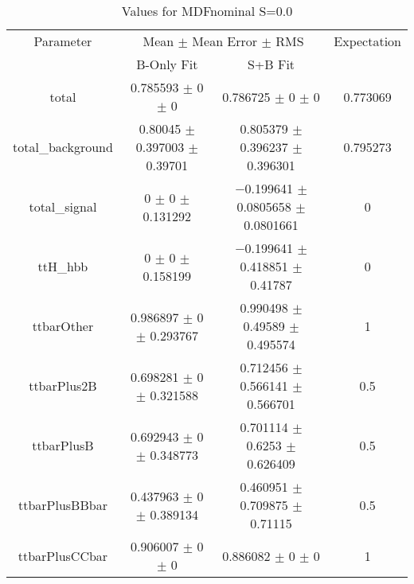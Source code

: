 \begin{table}
\centering
\caption{Values for MDFnominal S=0.0}
\begin{tabular}{cccc}
\toprule
Parameter & \multicolumn{2}{c}{Mean $\pm$ Mean Error $\pm$ RMS} & Expectation\\
 & B-Only Fit & S+B Fit & \\
\midrule
total & \num{0.785593} $\pm$ \num{0} $\pm$ \num{0} & \num{0.786725} $\pm$ \num{0} $\pm$ \num{0} & \num{0.773069}\\
total\_background & \num{0.80045} $\pm$ \num{0.397003} $\pm$ \num{0.39701} & \num{0.805379} $\pm$ \num{0.396237} $\pm$ \num{0.396301} & \num{0.795273}\\
total\_signal & \num{0} $\pm$ \num{0} $\pm$ \num{0.131292} & \num{-0.199641} $\pm$ \num{0.0805658} $\pm$ \num{0.0801661} & \num{0}\\
ttH\_hbb & \num{0} $\pm$ \num{0} $\pm$ \num{0.158199} & \num{-0.199641} $\pm$ \num{0.418851} $\pm$ \num{0.41787} & \num{0}\\
ttbarOther & \num{0.986897} $\pm$ \num{0} $\pm$ \num{0.293767} & \num{0.990498} $\pm$ \num{0.49589} $\pm$ \num{0.495574} & \num{1}\\
ttbarPlus2B & \num{0.698281} $\pm$ \num{0} $\pm$ \num{0.321588} & \num{0.712456} $\pm$ \num{0.566141} $\pm$ \num{0.566701} & \num{0.5}\\
ttbarPlusB & \num{0.692943} $\pm$ \num{0} $\pm$ \num{0.348773} & \num{0.701114} $\pm$ \num{0.6253} $\pm$ \num{0.626409} & \num{0.5}\\
ttbarPlusBBbar & \num{0.437963} $\pm$ \num{0} $\pm$ \num{0.389134} & \num{0.460951} $\pm$ \num{0.709875} $\pm$ \num{0.71115} & \num{0.5}\\
ttbarPlusCCbar & \num{0.906007} $\pm$ \num{0} $\pm$ \num{0} & \num{0.886082} $\pm$ \num{0} $\pm$ \num{0} & \num{1}\\
\bottomrule
\end{tabular}
\end{table}